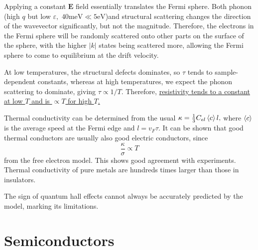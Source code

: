 \documentclass{article}
\theoremstyle{nonumberplain}
\begin{document}
Applying a constant $\mathbf{E} $ field essentially translates the Fermi sphere. Both phonon (high $q$ but low $\varepsilon,$ $40\mathrm{meV} \ll 5\mathrm{eV} $)and structural scattering changes the direction of the wavevector significantly, but not the magnitude. Therefore, the electrons in the Fermi sphere will be randomly scattered onto other parts on the surface of the sphere, with the higher $\left\vert k \right\vert $ states being scattered more, allowing the Fermi sphere to come to equilibrium at the drift velocity. 

At low temperatures, the structural defects dominates, so $\tau$ tends to sample-dependent constants, whereas at high temperatures, we expect the phonon scattering to dominate, giving $\tau \propto 1/T.$ Therefore, \underline{resistivity tends to a constant at low $T$ and is $\propto T$ for high $T$.}

Thermal conductivity can be determined from the usual \(\kappa  = \frac{1}{3} C_{el} \expval{c} l,\) where $\expval{c}$ is the average speed at the Fermi edge and $l = v_F \tau.$ It can be shown that good thermal conductors are usually also good electric conductors, since
\[
    \frac{\kappa }{\sigma } \propto T
\]
from the free electron model. This shows good agreement with experiments. Thermal conductivity of pure metals are hundreds times larger than those in insulators. 

The sign of quantum hall effects cannot always be accurately predicted by the model, marking its limitations. 
\section{Semiconductors}
\end{document}
